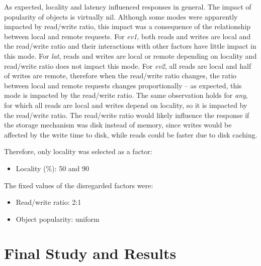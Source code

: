 \documentclass[man,floatsintext,12pt]{apa6}
\begin{document}
As expected, locality and latency influenced responses in general. The impact
of popularity of objects is virtually nil. Although some modes were apparently
impacted by read/write ratio, this impact was a consequence of the relationship
between local and remote requests. For \textit{ev1}, both reads and writes are
local and the read/write ratio and their interactions with other factors have
little impact in this mode. For \textit{lat}, reads and writes are local or
remote depending on locality and read/write ratio does not impact this mode.
For \textit{ev2}, all reads are local and half of writes are remote, therefore
when the read/write ratio changes, the ratio between local and remote requests
changes proportionally -- as expected, this mode is impacted by the read/write
ratio. The same observation holds for \textit{any}, for which all reads are
local and writes depend on locality, so it is impacted by the read/write ratio.
The read/write ratio would likely influence the response if the storage
mechanism was disk instead of memory, since writes would be affected by the
write time to disk, while reads could be faster due to disk caching.

Therefore, only locality was selected as a factor:

\begin{itemize}

\item Locality (\%): 50 and 90

\end{itemize}

The fixed values of the disregarded factors were:

\begin{itemize}

\item Read/write ratio: 2:1

\item Object popularity: uniform

\end{itemize}

\section{Final Study and Results}
\end{document}
